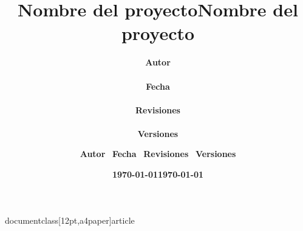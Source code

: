 documentclass[12pt,a4paper]{article}

\usepackage[utf8]{inputenc}
\usepackage[T1]{fontenc}
\usepackage[spanish]{babel}
\usepackage{amsmath,amssymb,amsfonts,amsthm}
\usepackage{graphicx}
\usepackage{hyperref}
\usepackage{url}
\usepackage{cite}

\title{\textbf{Nombre del proyecto}}
\author{\textbf{Autor} \\\\
        \textbf{Fecha} \\\\
        \textbf{Revisiones} \\\\
        \textbf{Versiones}}
\date{\textbf{\today}}

\usepackage{geometry}

\usepackage{titlesec}
\titleformat{\section}[hang]
  {\normalfont\Large\bfseries}{\thesection}{1em}{}
\titleformat{\subsection}[hang]
  {\normalfont\large\bfseries}{\thesubsection}{1em}{}
\titleformat{\subsubsection}[hang]
  {\normalfont\normalsize\bfseries}{\thesubsubsection}{1em}{}

\usepackage{tocloft}
\renewcommand{\cfttoctitlefont}{\hfill\Large\bfseries}
\renewcommand{\cftaftertoctitle}{\hfill}
\renewcommand{\cftsecfont}{\bfseries}
\renewcommand{\cftsubsecfont}{\normalfont}
\renewcommand{\cftsubsubsecfont}{\normalfont}
\setlength{\cftsecindent}{0pt}
\setlength{\cftsubsecindent}{20pt}
\setlength{\cftsubsubsecindent}{40pt}

\title{\textbf{Nombre del proyecto}}
\author{\textbf{Autor} \ \textbf{Fecha} \ \textbf{Revisiones} \ \textbf{Versiones}}
\date{\textbf{\today}}



